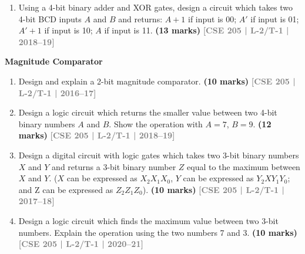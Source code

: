\documentclass[12pt,a4paper]{article}
\newcommand{\yr}[1]{\hfill\textcolor{gray}{\small\textbf{[#1]}}}
\newcommand{\mk}[1]{\textcolor{orange!70!black}{\small\textbf{(#1 marks)}}}
\newcommand{\subtopic}[2]{%
  \vspace{10pt}
  \noindent\begin{tcolorbox}[colback=#1!8,colframe=#1,boxrule=0.6pt,arc=4pt,
    left=6pt,right=6pt,top=4pt,bottom=4pt]
    \small\bfseries\textcolor{#1}{#2}
  \end{tcolorbox}
  \vspace{2pt}
}
\begin{document}
\begin{enumerate}
\begin{center}
\end{center}

\mk{8} \yr{CSE 205 | L-2/T-1 | 2016--17}

\item Using a 4-bit binary adder and XOR gates, design a circuit which takes two 4-bit BCD inputs $A$ and $B$ and returns: $A+1$ if input is 00; $A'$ if input is 01; $A'+1$ if input is 10; $A$ if input is 11.
\mk{13} \yr{CSE 205 | L-2/T-1 | 2018--19}

\end{enumerate}

\subtopic{cD}{Magnitude Comparator}
\label{sub:s4-comparator}

\begin{enumerate}

\item Design and explain a 2-bit magnitude comparator.
\mk{10} \yr{CSE 205 | L-2/T-1 | 2016--17}

\item Design a logic circuit which returns the smaller value between two 4-bit binary numbers $A$ and $B$. Show the operation with $A=7$, $B=9$.
\mk{12} \yr{CSE 205 | L-2/T-1 | 2018--19}

\item Design a digital circuit with logic gates which takes two 3-bit binary numbers $X$ and $Y$ and returns a 3-bit binary number $Z$ equal to the maximum between $X$ and $Y$. 
($X$ can be expressed as $X_2X_1X_0$, $Y$ can be expressed as $Y_2XY_1Y_0$; and Z can be
expressed as $Z_2Z_1Z_0$).
\mk{10} \yr{CSE 205 | L-2/T-1 | 2017--18}

\item Design a logic circuit which finds the maximum value between two 3-bit numbers. Explain the operation using the two numbers 7 and 3.
\mk{10} \yr{CSE 205 | L-2/T-1 | 2020--21}

\end{enumerate}
\end{document}
